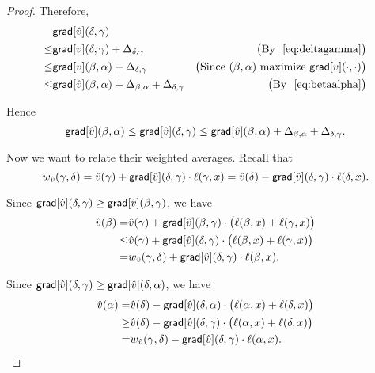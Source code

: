 \documentclass[12pt]{amsart}
\newcommand{\grad}{\ensuremath{\mathsf{grad}}}
\begin{document}
\begin{proof}
Therefore,
\begin{align*}
&\grad[\V{\hat{v}}](\delta,\gamma) \\
\leq& \grad[\V{v}](\delta,\gamma)+\Delta_{\delta,\gamma} &\paren{\text{By ~\eqref{eq:deltagamma}}}\\
\leq& \grad[\V{v}](\beta,\alpha)+\Delta_{\delta,\gamma} &\paren{\text{Since }(\beta,\alpha)\text{ maximize }\grad[\V{v}](\cdot,\cdot)}\\
\leq& \grad[\V{\hat{v}}](\beta,\alpha) + \Delta_{\beta,\alpha} + \Delta_{\delta,\gamma} &\paren{\text{By ~\eqref{eq:betaalpha}}}
\end{align*}

Hence
\begin{equation}\label{eq:gradientrelation}
\grad[\V{\hat{v}}](\beta,\alpha)\leq \grad[\V{\hat{v}}](\delta,\gamma) \leq \grad[\V{\hat{v}}](\beta,\alpha) + \Delta_{\beta,\alpha} + \Delta_{\delta,\gamma}.
\end{equation}

Now we want to relate their weighted averages. Recall that $$w_{\V{\hat{v}}}(\gamma,\delta) = \V{\hat{v}}(\gamma) + \grad[\V{\hat{v}}](\delta,\gamma)\cdot\ell(\gamma,x) = \V{\hat{v}}(\delta) - \grad[\V{\hat{v}}](\delta,\gamma)\cdot\ell(\delta,x).$$

Since $\grad[\V{\hat{v}}](\delta,\gamma) \geq \grad[\V{\hat{v}}](\beta,\gamma)$, we have
\begin{equation}\label{eq:upperboundvhatbeta}
\begin{split}
\V{\hat{v}}(\beta)
=& \V{\hat{v}}(\gamma) + \grad[\V{\hat{v}}](\beta,\gamma)\cdot \paren{\ell(\beta,x)+\ell(\gamma,x)} \\
\leq& \V{\hat{v}}(\gamma) + \grad[\V{\hat{v}}](\delta,\gamma) \cdot \paren{\ell(\beta,x)+\ell(\gamma,x)} \\
=& w_{\V{\hat{v}}}(\gamma,\delta) + \grad[\V{\hat{v}}](\delta,\gamma) \cdot \ell(\beta,x).
\end{split}
\end{equation}

Since $\grad[\V{\hat{v}}](\delta,\gamma) \geq \grad[\V{\hat{v}}](\delta,\alpha)$, we have
\begin{equation}\label{eq:lowerboundvhatalpha}
\begin{split}
\V{\hat{v}}(\alpha)
=& \V{\hat{v}}(\delta) - \grad[\V{\hat{v}}](\delta,\alpha)\cdot\paren{\ell(\alpha,x)+\ell(\delta,x)} \\
\geq&  \V{\hat{v}}(\delta) - \grad[\V{\hat{v}}](\delta,\gamma)\cdot\paren{\ell(\alpha,x)+\ell(\delta,x)} \\
=& w_{\V{\hat{v}}}(\gamma,\delta) -\grad[\V{\hat{v}}](\delta,\gamma)\cdot\ell(\alpha,x).
\end{split}
\end{equation}


\end{proof}
\end{document}
